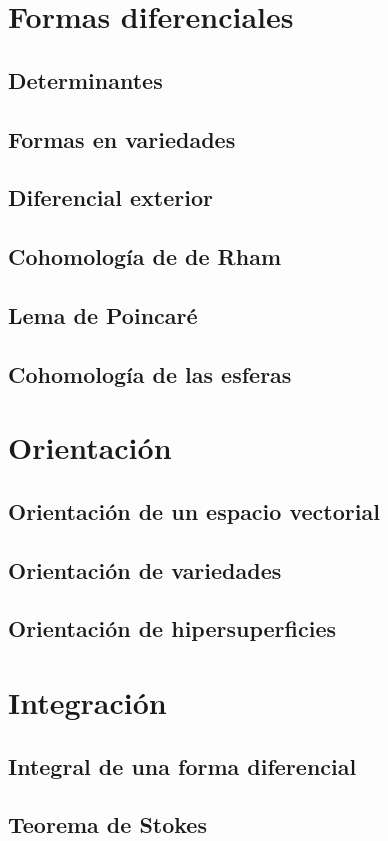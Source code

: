\documentclass[12pt,a4paper]{book}
\theoremstyle{definition} \newtheorem{defn}[thm]{Definición}
\theoremstyle{definition} \newtheorem{ejemplo}[thm]{Ejemplo}
\theoremstyle{definition} \newtheorem{ejercicio}[thm]{Ejercicio}
\theoremstyle{remark} \newtheorem*{obs}{Observación}
\begin{document}
	  \chapter{Formas diferenciales}
	  \section{Determinantes}
	  \section{Formas en variedades}
	  \section{Diferencial exterior}
	  \section{Cohomología de de Rham}
	  \section{Lema de Poincaré}
	  \section{Cohomología de las esferas}
	  \chapter{Orientación}
	  \section{Orientación de un espacio vectorial}
	  \section{Orientación de variedades}
	  \section{Orientación de hipersuperficies}
	  \chapter{Integración}
	  \section{Integral de una forma diferencial}
	  \section{Teorema de Stokes}
\end{document}
